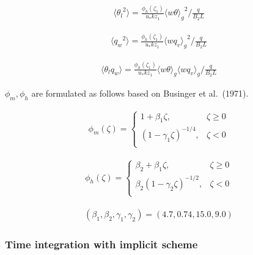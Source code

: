 \begin{eqnarray}\langle {\theta_l}^2\rangle=\frac{\phi_h\left(\zeta_1\right)}{u_*kz_1}{\langle w\theta \rangle_g}^2 \bigg/ \frac{q}{B_2L} \end{eqnarray}

\begin{eqnarray}\langle {q_w}^2\rangle=\frac{\phi_h\left(\zeta_1\right)}{u_*kz_1}{\langle wq_v\rangle_g}^2 \bigg/ \frac{q}{B_2L} \end{eqnarray}

\begin{eqnarray}\langle \theta_lq_w\rangle=\frac{\phi_h\left(\zeta_1\right)}{u_*kz_1}\langle w\theta \rangle_g\langle wq_v \rangle_g \bigg/ \frac{q}{B_2L} \end{eqnarray}

\(\phi_m,\phi_h\) are formulated as follows based on Businger et
al.~(1971).

\begin{eqnarray}
\phi_m(\zeta)=\left\{
    \begin{array}{lr}
      1+\beta_1\zeta, &\zeta\ge 0\\
      \left(1-\gamma_1\zeta\right)^{-1/4}, &\zeta< 0\\
    \end{array}
  \right.
\end{eqnarray}

\begin{eqnarray}
\phi_h(\zeta)=\left\{
    \begin{array}{lr}
      \beta_2+\beta_1\zeta, &\zeta\ge 0\\
      \beta_2\left(1-\gamma_2\zeta\right)^{-1/2}, &\zeta< 0\\
    \end{array}
  \right.
\end{eqnarray}

\begin{eqnarray}(\beta_1,\beta_2,\gamma_1,\gamma_2)=(4.7,0.74,15.0,9.0)\end{eqnarray}

\hypertarget{time-integration-with-implicit-scheme}{%
\subsubsection{Time integration with implicit
scheme}\label{time-integration-with-implicit-scheme}}
